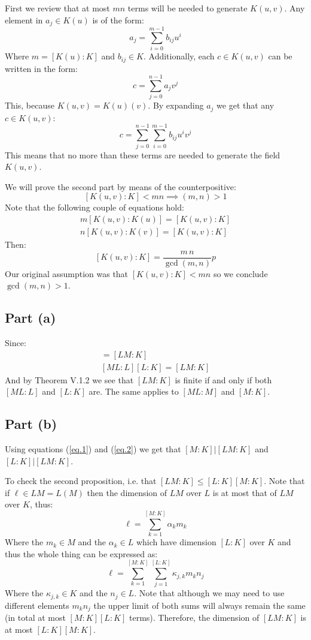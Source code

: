 First we review that at most $mn$ terms will be needed to generate $K(u,v)$.
Any element in $a_j\in K(u)$ is of the form:
$$a_j = \sum_{i=0}^{m-1} b_{ij} u^i$$
Where $m=[K(u):K]$ and $b_{ij}\in K$. 
Additionally, each $c\in K(u,v)$ can be written in the form:
$$c= \sum_{j=0}^{n-1} a_{j} v^j$$
This, because $K(u,v)= K(u)(v)$. By expanding $a_j$ we get that any $c\in K(u,v)$:
$$c= \sum_{j=0}^{n-1} \sum_{i=0}^{m-1} b_{ij} u^i v^j$$
This means that no more than these terms are needed to generate the field $K(u,v)$.

We will prove the second part by means of the counterpositive: 
$$[K(u,v):K]<mn \implies (m,n)>1$$ 
Note that the following couple of equations hold:
\begin{gather*}
m[K(u,v):K(u)] = [K(u,v):K]\\
n[K(u,v):K(v)] = [K(u,v):K]
\end{gather*}
Then:
$$[K(u,v):K] = \frac{m\, n}{\gcd(m,n)}p$$
Our original assumption was that $[K(u,v):K]<mn$ so we conclude $\gcd(m,n)>1$. 

\subsection*{Part (a)}
Since:
\begin{gather} 
    [ML:M][M:K] = [LM:K]\label{eq.1}\\
    [ML:L][L:K] = [LM:K]\label{eq.2}
\end{gather}
And by Theorem V.1.2 we see that $[LM:K]$ is finite if and only if both $[ML:L]$ and $[L:K]$ are.
The same applies to $[ML:M]$ and $[M:K]$. 

\subsection*{Part (b)}
Using equations (\ref{eq.1}) and (\ref{eq.2}) we get that $[M:K]| [LM:K]$ and $[L:K]| [LM:K]$. 

To check the second proposition, i.e. that $[LM:K]\leq [L:K][M:K]$. Note that if $\ell \in LM = L(M)$ then the dimension of $LM$ over $L$ is at most that of $LM$ over $K$, thus:
$$\ell = \sum_{k=1}^{[M:K]}\alpha_k m_k$$
Where the  $m_k\in M$ and the $\alpha_k \in L$ which have dimension $[L:K]$ over $K$ and thus the whole thing can be expressed as:
$$\ell =  \sum_{k=1}^{[M:K]}\sum_{j=1}^{[L:K]}\kappa_{j,k}m_kn_j$$
Where the $\kappa_{j,k}\in K$ and the $n_j\in L$. 
Note that although we may need to use different elements $m_kn_j$ the upper limit of both sums will always remain the same (in total at most $[M:K][L:K]$ terms). 
Therefore, the dimension of $[LM:K]$ is at most $[L:K][M:K]$. 
